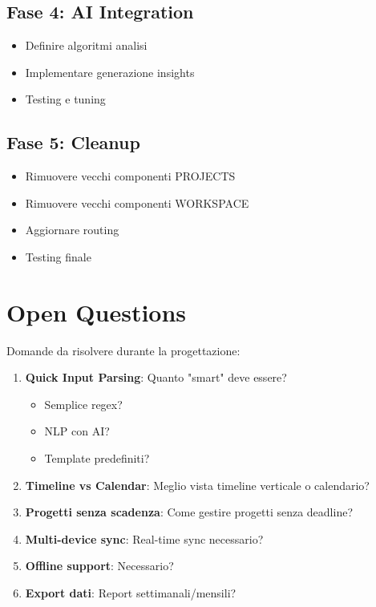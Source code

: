 \documentclass[11pt,a4paper]{article}
\begin{document}
\subsection{Fase 4: AI Integration}

\begin{itemize}
    \item [ ] Definire algoritmi analisi
    \item [ ] Implementare generazione insights
    \item [ ] Testing e tuning
\end{itemize}

\subsection{Fase 5: Cleanup}

\begin{itemize}
    \item [ ] Rimuovere vecchi componenti PROJECTS
    \item [ ] Rimuovere vecchi componenti WORKSPACE
    \item [ ] Aggiornare routing
    \item [ ] Testing finale
\end{itemize}

\newpage

\section{Open Questions}

Domande da risolvere durante la progettazione:

\begin{enumerate}
    \item \textbf{Quick Input Parsing}: Quanto "smart" deve essere? 
    \begin{itemize}
        \item Semplice regex?
        \item NLP con AI?
        \item Template predefiniti?
    \end{itemize}
    
    \item \textbf{Timeline vs Calendar}: Meglio vista timeline verticale o calendario?
    
    \item \textbf{Progetti senza scadenza}: Come gestire progetti senza deadline?
    
    \item \textbf{Multi-device sync}: Real-time sync necessario?
    
    \item \textbf{Offline support}: Necessario?
    
    \item \textbf{Export dati}: Report settimanali/mensili?
    
\end{enumerate}
\end{document}
